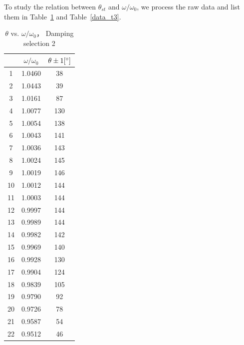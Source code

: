 To study the relation between $\theta_{st}$ and $\omega/\omega_0$, we process the raw data and list them in Table~\ref{data_t2} and Table~\ref{data_t3}.









\begin{table}[H]
\centering
\begin{tabular}{|c|c|c|}
\hline
& $\omega/\omega_0$ &  $\theta \pm 1 [^\circ] $ \\ \hline
1  & 1.0460  & 38   \\ \hline
2  & 1.0443  & 39   \\ \hline
3  & 1.0161  & 87   \\ \hline
4  & 1.0077  & 130  \\ \hline
5  & 1.0054  & 138  \\ \hline
6  & 1.0043  & 141  \\ \hline
7  & 1.0036  & 143  \\ \hline
8  & 1.0024  & 145  \\ \hline
9  & 1.0019  & 146  \\ \hline
10 & 1.0012  & 144  \\ \hline
11 & 1.0003  & 144  \\ \hline
12 & 0.9997  & 144  \\ \hline
13 & 0.9989  & 144  \\ \hline
14 & 0.9982  & 142  \\ \hline
15 & 0.9969  & 140  \\ \hline
16 & 0.9928  & 130  \\ \hline
17 & 0.9904  & 124  \\ \hline
18 & 0.9839  & 105  \\ \hline
19 & 0.9790  & 92   \\ \hline
20 & 0.9726  & 78   \\ \hline
21 & 0.9587  & 54   \\ \hline
22 & 0.9512  & 46   \\ \hline
\end{tabular}    
\caption{$\theta$ vs. $\omega/\omega_0$， Damping selection 2}\label{data_t2}
\end{table}

